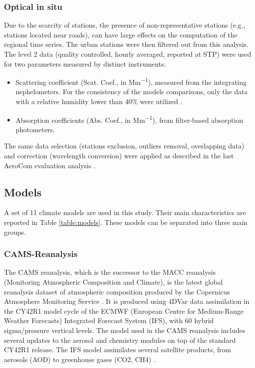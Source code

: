 \documentclass[journal abbreviation, manuscript]{copernicus}
\begin{document}
\subsubsection{Optical in situ}
Due to the scarcity of stations, the presence of non-representative stations (e.g., stations located near roads), can have large effects on the computation of the regional time series. The urban stations were then filtered out from this analysis. The level 2 data (quality controlled, hourly averaged, reported at STP) were used for two parameters measured by distinct instruments:

\begin{itemize}
 \item Scattering coefficient (Scat. Coef., in \unit{Mm^{-1}}), measured from the integrating nephelometers. For the consistency of the models comparisons, only the data with a relative humidity lower than 40\% were utilized \citep{pandolfi2018european}.
 \item Absorption coefficients (Abs. Coef., in \unit{Mm^{-1}}), from filter-based absorption photometers.
\end{itemize}

The same data selection (stations exclusion, outliers removal, overlapping data) and correction (wavelength conversion) were applied as described in the last AeroCom evaluation analysis \citep{jonaseval}.

\subsection{Models}
A set of 11 climate models are used in this study. Their main characteristics are reported in Table \ref{table:models}. These models can be separated into three main groups.

\subsubsection{CAMS-Reanalysis}
The CAMS reanalysis, which is the successor to the MACC reanalysis (Monitoring Atmospheric Composition and Climate), is the latest global reanalysis dataset of atmospheric composition produced by the Copernicus Atmosphere Monitoring Service \citep{inness2019cams}. It is produced using 4DVar data assimilation in the CY42R1 model cycle of the ECMWF (European Centre for Medium-Range Weather Forecasts) Integrated Forecast System (IFS), with 60 hybrid sigma/pressure vertical levels. The model used in the CAMS reanalysis includes several updates to the aerosol and chemistry modules on top of the standard CY42R1 release. The IFS model assimilates several satellite products, from aerosols (AOD) to greenhouse gases (CO2, CH4) \cite{inness2019cams}.
\end{document}
